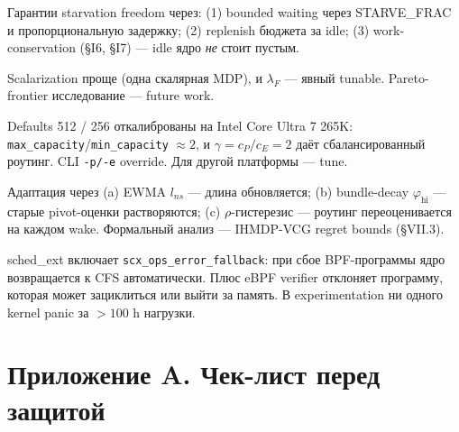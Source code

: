 \documentclass[11pt,a4paper]{article}
\begin{document}
\begin{ask}
Гарантии starvation freedom через: (1) bounded waiting через
STARVE\_FRAC и пропорциональную задержку; (2) replenish бюджета за
idle; (3) work-conservation (§I6, §I7) — idle ядро \emph{не}
стоит пустым.
\end{ask}

\begin{ask}
Scalarization проще (одна скалярная MDP), и $\lambda_F$ — явный
tunable. Pareto-frontier исследование — future work.
\end{ask}

\begin{ask}
Defaults 512 / 256 откалиброваны на Intel Core Ultra 7 265K:
\texttt{max\_capacity}/\texttt{min\_capacity} $\approx 2$, и
$\gamma=c_P/c_E=2$ даёт сбалансированный роутинг. CLI \texttt{-p/-e}
override. Для другой платформы — tune.
\end{ask}

\begin{ask}
Адаптация через (a) EWMA $l_{ns}$ — длина обновляется; (b)
bundle-decay $\varphi_{\text{hi}}$ — старые pivot-оценки растворяются;
(c) $\rho$-гистерезис — роутинг переоценивается на каждом wake.
Формальный анализ — IHMDP-VCG regret bounds (§VII.3).
\end{ask}

\begin{ask}
sched\_ext включает \texttt{scx\_ops\_error\_fallback}: при сбое
BPF-программы ядро возвращается к CFS автоматически. Плюс eBPF
verifier отклоняет программу, которая может зациклиться или выйти
за память. В experimentation ни одного kernel panic за $>\!100$ h
нагрузки.
\end{ask}

\section*{Приложение A. Чек-лист перед защитой}
\end{document}
